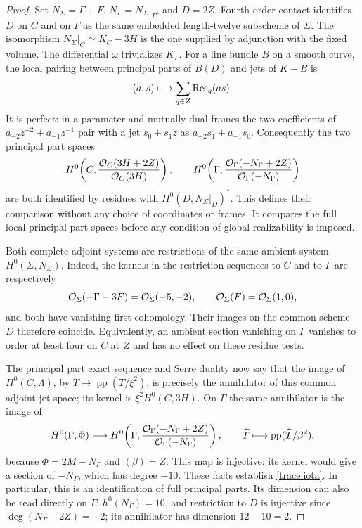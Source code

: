 \begin{proof}
Set $N_\Sigma=\Gamma+F$, $N_\Gamma=N_\Sigma|_\Gamma$, and $D=2Z$.
Fourth-order contact identifies $D$ on $C$ and on $\Gamma$ as the same
embedded length-twelve subscheme of $\Sigma$.  The isomorphism
$N_\Sigma|_C\simeq K_C-3H$ is the one supplied by adjunction with the
fixed volume.  The differential $\omega$ trivializes $K_\Gamma$.
For a line bundle $B$ on a smooth curve, the local pairing between
principal parts of $B(D)$ and jets of $K-B$ is
\[
 (a,s)\longmapsto\sum_{q\in Z}\operatorname{Res}_q(as).
\]
It is perfect: in a parameter and mutually dual frames the two
coefficients of $a_{-2}z^{-2}+a_{-1}z^{-1}$ pair with a jet
$s_0+s_1z$ as $a_{-2}s_1+a_{-1}s_0$.
Consequently the two principal part spaces
\[
 H^0\!\left(C,\frac{\mathcal O_C(3H+2Z)}{\mathcal O_C(3H)}\right),
 \qquad
 H^0\!\left(\Gamma,
       \frac{\mathcal O_\Gamma(-N_\Gamma+2Z)}{\mathcal O_\Gamma(-N_\Gamma)}\right)
\]
are both identified by residues with
$H^0(D,N_\Sigma|_D)^*$.  This defines their comparison without any
choice of coordinates or frames. It compares the full local
principal-part spaces before any condition of global realizability
is imposed.

Both complete adjoint systems are restrictions of the same ambient
system $H^0(\Sigma,N_\Sigma)$.  Indeed, the kernels in the restriction
sequences to $C$ and to $\Gamma$ are respectively
\[
 \mathcal O_\Sigma(-\Gamma-3F)=\mathcal O_\Sigma(-5,-2),
 \qquad \mathcal O_\Sigma(F)=\mathcal O_\Sigma(1,0),
\]
and both have vanishing first cohomology.  Their images on the common
scheme $D$ therefore coincide.  Equivalently, an ambient section
vanishing on $\Gamma$ vanishes to order at least four on $C$ at $Z$
and has no effect on these residue tests.

The principal part exact sequence and Serre duality now say that the
image of $H^0(C,\Lambda)$, by $T\mapsto\operatorname{pp}(T/\xi^2)$,
is precisely the annihilator of this common adjoint jet space; its
kernel is $\xi^2H^0(C,3H)$.  On $\Gamma$ the same annihilator is the
image of
\[
 H^0(\Gamma,\Phi)\longrightarrow
 H^0\!\left(\Gamma,
       \frac{\mathcal O_\Gamma(-N_\Gamma+2Z)}{\mathcal O_\Gamma(-N_\Gamma)}\right),
 \qquad \widetilde T\longmapsto
       \operatorname{pp}(\widetilde T/\beta^2),
\]
because $\Phi=2M-N_\Gamma$ and $(\beta)=Z$.
This map is injective: its kernel would give a section of
$-N_\Gamma$, which has degree $-10$.
These facts establish \eqref{trace:iota}.  In particular, this is an
identification of full principal parts.  Its dimension can also be
read directly on $\Gamma$: $h^0(N_\Gamma)=10$, and restriction to
$D$ is injective since $\deg(N_\Gamma-2Z)=-2$; its annihilator has
dimension $12-10=2$.


\end{proof}
